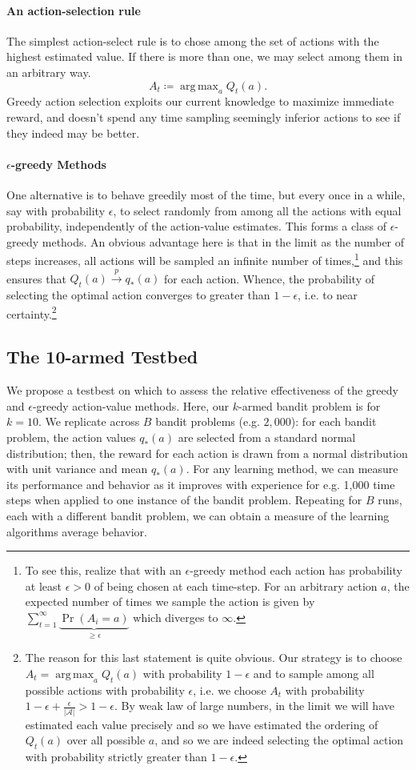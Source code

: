 \documentclass[12pt]{article}
\DeclareMathOperator*{\argmax}{arg\,max}
\begin{document}
\paragraph{An action-selection rule} The simplest action-select rule is to chose among the set of actions with the highest estimated value. If there is more than one, we may select among them in an arbitrary way.
\[
A_t \coloneqq \argmax_a Q_t(a).
\]
Greedy action selection exploits our current knowledge to maximize immediate reward, and doesn't spend any time sampling seemingly inferior actions to see if they indeed may be better.

\paragraph{$\epsilon$-greedy Methods}
One alternative is to behave greedily most of the time, but every once in a while, say with probability $\epsilon$, to select randomly from among all the actions with equal probability, independently of the action-value estimates. This forms a class of $\epsilon$-greedy methods. An obvious advantage here is that in the limit as the number of steps increases, all actions will be sampled an infinite number of times,\footnote{To see this, realize that with an $\epsilon$-greedy method each action has probability at least $\epsilon > 0$ of being chosen at each time-step. For an arbitrary action $a$, the expected number of times we sample the action is given by $\sum_{t=1}^{\infty} \underbrace{\Pr(A_i = a)}_{\geq \epsilon}$ which diverges to $\infty$.} and this ensures that $Q_t(a) \overset{p}{\longrightarrow} q_*(a)$ for each action. Whence, the probability of selecting the optimal action converges to greater than $1-\epsilon$, i.e. to near certainty.\footnote{The reason for this last statement is quite obvious. Our strategy is to choose $A_t = \argmax_a Q_t(a)$ with probability $1-\epsilon$ and to sample among all possible actions with probability $\epsilon$, i.e. we choose $A_t$ with probability $1-\epsilon + \frac{\epsilon}{|\mathcal A|} > 1 - \epsilon$. By weak law of large numbers, in the limit we will have estimated each value precisely and so we have estimated the ordering of $Q_t(a)$ over all possible $a$, and so we are indeed selecting the optimal action with probability strictly greater than $1-\epsilon$.}

\subsection{The 10-armed Testbed} We propose a testbest on which to assess the relative effectiveness of the greedy and $\epsilon$-greedy action-value methods. Here, our $k$-armed bandit problem is for $k=10$. We replicate across $B$ bandit problems (e.g. $2,000$): for each bandit problem, the action values $q_*(a)$ are selected from a standard normal distribution; then, the reward for each action
is drawn from a normal distribution with unit variance and mean $q_*(a)$. For any learning method, we can measure its performance and behavior as it improves with experience for e.g. 1,000 time steps when applied to one instance of the bandit problem. Repeating for $B$ runs, each with a different bandit problem, we can obtain a measure of the learning algorithms average behavior.
\end{document}
